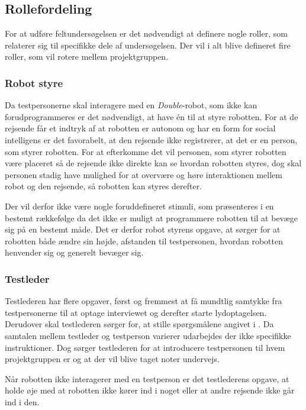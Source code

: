 \subsection*{Rollefordeling}
\label{Rollefordeling}
%
For at udføre feltundersøgelsen er det nødvendigt at definere nogle roller, som relaterer sig til specifikke dele af undersøgelsen. Der vil i alt blive defineret fire roller, som vil rotere mellem projektgruppen.
%
\subsubsection*{Robot styre}
Da testpersonerne skal interagere med en \textit{Double}-robot, som ikke kan forudprogrammeres er det nødvendigt, at have én til at styre robotten. For at de rejsende får et indtryk af at robotten er autonom og har en form for social intelligens er det favorabelt, at den rejsende ikke registrerer, at det er en person, som styrer robotten. For at efterkomme det vil personen, som styrer robotten være placeret så de rejsende ikke direkte kan se hvordan robotten styres, dog skal personen stadig have mulighed for at overvære og høre interaktionen mellem robot og den rejsende, så robotten kan styres derefter.

Der vil derfor ikke være nogle foruddefineret stimuli, som præsenteres i en bestemt rækkefølge da det ikke er muligt at programmere robotten til at bevæge sig på en bestemt måde. Det er derfor robot styrens opgave, at sørger for at robotten både ændre sin højde, afstanden til testpersonen, hvordan robotten henvender sig og generelt bevæger sig.   

\subsubsection*{Testleder}
Testlederen har flere opgaver, først og fremmest at få mundtlig samtykke fra testpersonerne til at optage interviewet og derefter starte lydoptagelsen. Derudover skal testlederen sørger for, at stille spørgsmålene angivet i . Da samtalen mellem testleder og testperson varierer udarbejdes der ikke specifikke instruktioner. Dog sørger testlederen for at introducere testpersonen til hvem projektgruppen er og at der vil blive taget noter undervejs. 

Når robotten ikke interagerer med en testperson er det testlederens opgave, at holde øje med at robotten ikke kører ind i noget eller at andre rejsende ikke går ind i den.    

